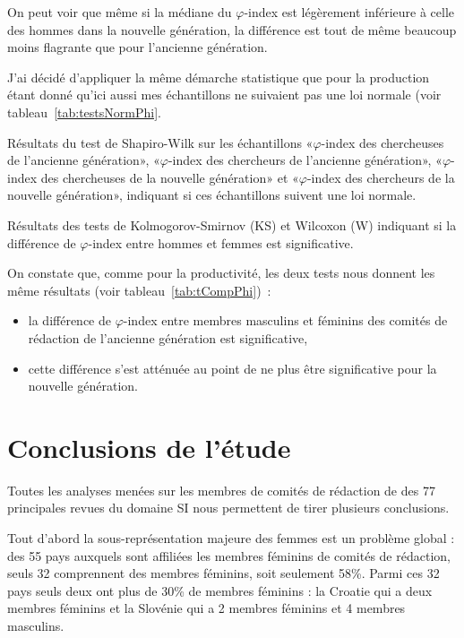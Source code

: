 			On peut voir que même si la médiane du $\varphi$-index est légèrement inférieure à celle des hommes dans la nouvelle génération, la différence est tout de même beaucoup moins flagrante que pour l'ancienne génération.
			
			J'ai décidé d'appliquer la même démarche statistique que pour la production étant donné qu'ici aussi mes échantillons ne suivaient pas une loi normale (voir tableau~\ref{tab:testsNormPhi}.
			
			\begin{table}[ht]
				\centering
				\caption{Résultats du test de Shapiro-Wilk sur les échantillons «$\varphi$-index des chercheuses de l'ancienne génération», «$\varphi$-index des chercheurs de l'ancienne génération», «$\varphi$-index des chercheuses de la nouvelle génération» et «$\varphi$-index des chercheurs de la nouvelle génération», indiquant si ces échantillons suivent une loi normale.}\label{tab:testsNormPhi}
				
			\end{table}
			
			\begin{table}[p]
				\centering
				\caption{Résultats des tests de Kolmogorov-Smirnov (KS) et Wilcoxon (W) indiquant si la différence de $\varphi$-index entre hommes et femmes est significative.}\label{tab:tCompPhi}
				
			\end{table}
			
			On constate que, comme pour la productivité, les deux tests nous donnent les même résultats (voir tableau~\ref{tab:tCompPhi})~:
			\begin{itemize}
				\item la différence de $\varphi$-index entre membres masculins et féminins des comités de rédaction de l'ancienne génération est significative,
				\item cette différence s'est atténuée au point de ne plus être significative pour la nouvelle génération.
			\end{itemize}
	

	\section{Conclusions de l'étude}
		Toutes les analyses menées sur les membres de comités de rédaction de des 77 principales revues du domaine SI nous permettent de tirer plusieurs conclusions.
		
		Tout d'abord la sous-représentation majeure des femmes est un problème global : des 55 pays auxquels sont affiliées les membres féminins de comités de rédaction, seuls 32 comprennent des membres féminins, soit seulement 58\%. Parmi ces 32 pays seuls deux ont plus de 30\% de membres féminins : la Croatie qui a deux membres féminins et la Slovénie qui a 2 membres féminins et 4 membres masculins.
		
